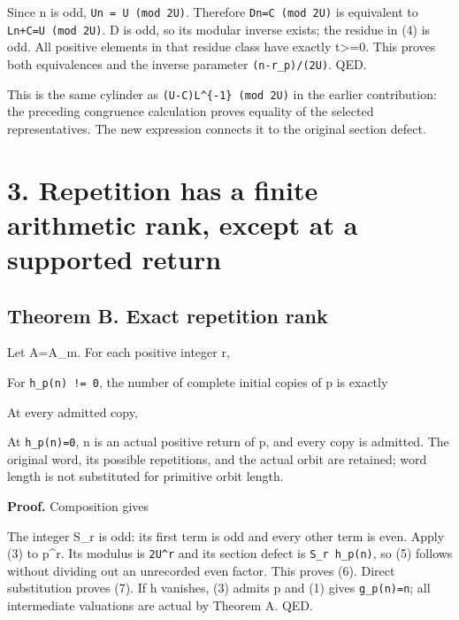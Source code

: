 Since n is odd, \nolinkurl{Un = U (mod 2U)}. Therefore
\nolinkurl{Dn=C (mod 2U)} is equivalent to \nolinkurl{Ln+C=U (mod 2U)}.
D is odd, so its modular inverse exists; the residue in (4) is odd. All
positive elements in that residue class have exactly t\textgreater=0.
This proves both equivalences and the inverse parameter
\nolinkurl{(n-r_p)/(2U)}. QED.

This is the same cylinder as \texttt{(U-C)L\^{}\{-1\}\ (mod\ 2U)} in the
earlier contribution: the preceding congruence calculation proves
equality of the selected representatives. The new expression connects it
to the original section defect.

\section{3. Repetition has a finite arithmetic rank, except at a
supported return}

\subsection{Theorem B. Exact repetition rank}

Let A=A\_m. For each positive integer r,


For \nolinkurl{h_p(n) != 0}, the number of complete initial copies of p
is exactly


At every admitted copy,


At \nolinkurl{h_p(n)=0}, n is an actual positive return of p, and every
copy is admitted. The original word, its possible repetitions, and the
actual orbit are retained; word length is not substituted for primitive
orbit length.

\textbf{Proof.} Composition gives


The integer S\_r is odd: its first term is odd and every other term is
even. Apply (3) to p\^{}r. Its modulus is \nolinkurl{2U^r} and its
section defect is \nolinkurl{S_r h_p(n)}, so (5) follows without
dividing out an unrecorded even factor. This proves (6). Direct
substitution proves (7). If h vanishes, (3) admits p and (1) gives
\nolinkurl{g_p(n)=n}; all intermediate valuations are actual by Theorem
A. QED.


